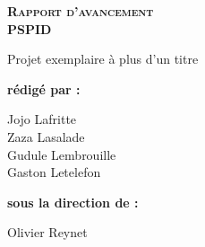 
\begingroup
\thispagestyle{empty}
\begin{center}
\vspace*{2cm}
{\Huge \textsc{\textbf{Rapport d'avancement}}}\\
\vspace*{2cm}
{\Huge \textbf{PSPID}}\par %
\vspace*{2cm}
{\huge Projet exemplaire à plus d'un titre}\par %
\end{center}
\vspace*{4cm}

\textbf{\huge rédigé par :} 

\begin{center}
{
\huge
Jojo Lafritte\\
Zaza Lasalade\\
Gudule Lembrouille\\
Gaston Letelefon\\
}
\end{center}

\vspace*{1cm}

{\huge \textbf{sous la direction de :}}\\
\begin{center}
{\huge
Olivier Reynet\\
}
\end{center}
\endgroup
